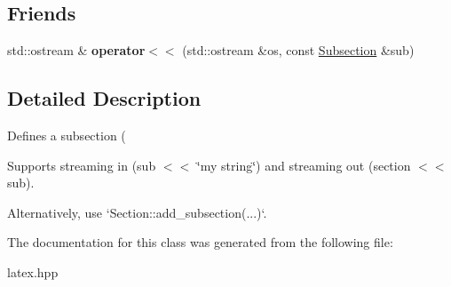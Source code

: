 \subsection*{\-Friends}
\begin{DoxyCompactItemize}
\item 
\hypertarget{classlatex_1_1doc_1_1Subsection_a6fae88d1537df6d93767459f4c918fe2}{std\-::ostream \& {\bfseries operator$<$$<$} (std\-::ostream \&os, const \hyperlink{classlatex_1_1doc_1_1Subsection}{\-Subsection} \&sub)}\label{classlatex_1_1doc_1_1Subsection_a6fae88d1537df6d93767459f4c918fe2}

\end{DoxyCompactItemize}


\subsection{\-Detailed \-Description}
\-Defines a subsection ( 

\-Supports streaming in (sub $<$$<$ \char`\"{}my string\char`\"{}) and streaming out (section $<$$<$ sub).

\-Alternatively, use `\-Section\-::add\-\_\-subsection(...)`. 

\-The documentation for this class was generated from the following file\-:\begin{DoxyCompactItemize}
\item 
latex.\-hpp\end{DoxyCompactItemize}
